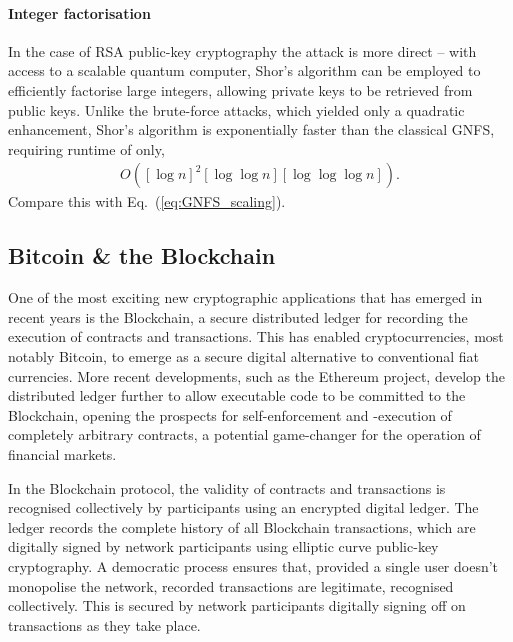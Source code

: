 %
%

\paragraph{Integer factorisation}

In the case of RSA public-key cryptography the attack is more direct -- with access to a scalable quantum computer, Shor's algorithm can be employed to efficiently factorise large integers, allowing private keys to be retrieved from public keys. Unlike the brute-force attacks, which yielded only a quadratic enhancement, Shor's algorithm is exponentially faster than the classical GNFS, requiring runtime of only,
\begin{align}
	O([\log n]^2[\log\log n][\log\log\log n]).
\end{align}
Compare this with Eq.~(\ref{eq:GNFS_scaling}).

%
%

\subsection{Bitcoin \& the Blockchain}

One of the most exciting new cryptographic applications that has emerged in recent years is the Blockchain, a secure distributed ledger for recording the execution of contracts and transactions. This has enabled cryptocurrencies, most notably Bitcoin, to emerge as a secure digital alternative to conventional fiat currencies. More recent developments, such as the Ethereum project, develop the distributed ledger further to allow executable code to be committed to the Blockchain, opening the prospects for self-enforcement and -execution of completely arbitrary contracts, a potential game-changer for the operation of financial markets.

In the Blockchain protocol, the validity of contracts and transactions is recognised collectively by participants using an encrypted digital ledger. The ledger records the complete history of all Blockchain transactions, which are digitally signed by network participants using elliptic curve public-key cryptography. A democratic process ensures that, provided a single user doesn't monopolise the network, recorded transactions are legitimate, recognised collectively. This is secured by network participants digitally signing off on transactions as they take place.

